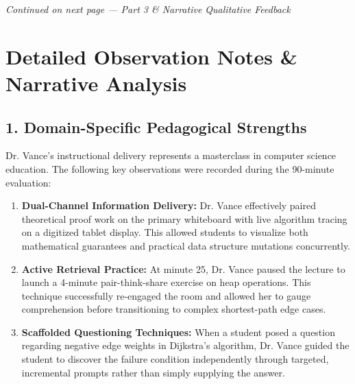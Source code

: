 \documentclass[10pt,a4paper]{article}
\begin{document}
\vfill
\centerline{\small\color{TextMuted}\textit{Continued on next page --- Part 3 \& Narrative Qualitative Feedback}}
\newpage


\section{Detailed Observation Notes \& Narrative Analysis}

\subsection{1. Domain-Specific Pedagogical Strengths}

Dr. Vance's instructional delivery represents a masterclass in computer science education. The following key observations were recorded during the 90-minute evaluation:

\begin{enumerate}[label=\textbf{\color{TealAccent}\lbrack\arabic*\rbrack}, leftmargin=*]
  \item \textbf{Dual-Channel Information Delivery:} Dr. Vance effectively paired theoretical proof work on the primary whiteboard with live algorithm tracing on a digitized tablet display. This allowed students to visualize both mathematical guarantees and practical data structure mutations concurrently.
  \item \textbf{Active Retrieval Practice:} At minute 25, Dr. Vance paused the lecture to launch a 4-minute pair-think-share exercise on heap operations. This technique successfully re-engaged the room and allowed her to gauge comprehension before transitioning to complex shortest-path edge cases.
  \item \textbf{Scaffolded Questioning Techniques:} When a student posed a question regarding negative edge weights in Dijkstra's algorithm, Dr. Vance guided the student to discover the failure condition independently through targeted, incremental prompts rather than simply supplying the answer.
\end{enumerate}

\vspace{8pt}
\end{document}
